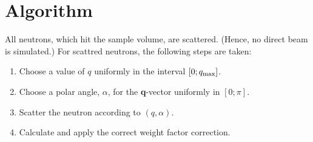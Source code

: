 \section{Algorithm}
All neutrons, which hit the sample volume, are scattered. 
(Hence, no direct beam is simulated.)
For scattred neutrons, the following steps are taken:
\begin{enumerate}
\item Choose a value of $q$ uniformly in the interval $[0;q_{\rm max}]$.
\item Choose a polar angle, $\alpha$, 
  for the {\bf q}-vector uniformly in $[0;\pi]$.
\item Scatter the neutron according to $(q,\alpha)$.
\item Calculate and apply the correct weight factor correction. 
\end{enumerate}
